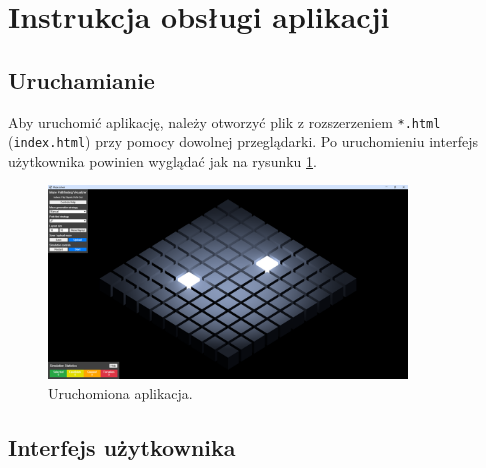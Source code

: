 \documentclass[../doc.tex]{subfiles}
\begin{document}
    \section{Instrukcja obsługi aplikacji}
    
    \subsection{Uruchamianie}

    Aby uruchomić aplikację, należy otworzyć plik z rozszerzeniem \texttt{*.html} (\texttt{index.html}) przy pomocy dowolnej przeglądarki. Po uruchomieniu interfejs użytkownika powinien wyglądać jak na rysunku \ref{fig:maze_start}.

    \begin{figure}[H]
        \centering
        \includegraphics[width=0.85\textwidth]{figures/start.png}
        \caption{Uruchomiona aplikacja.}
        \label{fig:maze_start}
    \end{figure}

    \subsection{Interfejs użytkownika}
\end{document}
